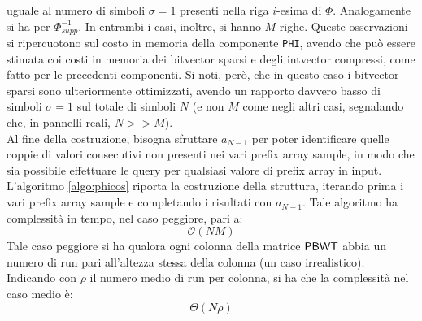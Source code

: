 uguale al numero di simboli $\sigma=1$ presenti nella riga $i$-esima di
$\varPhi$. Analogamente 
si ha per $\varPhi^{-1}_{supp}$. In entrambi i casi, inoltre, si hanno $M$
righe. Queste osservazioni si ripercuotono sul costo in memoria della componente
\texttt{PHI}, avendo che può essere stimata coi costi in memoria dei bitvector
sparsi e degli intvector compressi, come fatto per le precedenti componenti. Si
noti, però, che in questo caso i bitvector sparsi sono ulteriormente
ottimizzati,
avendo un rapporto davvero basso di simboli $\sigma=1$ sul totale di
simboli $N$ (e non $M$
come negli altri casi, segnalando che, in pannelli reali, $N>>M$).\\ 
Al fine della costruzione, bisogna sfruttare $a_{N-1}$ per poter
identificare quelle coppie di valori consecutivi non presenti nei vari
prefix array sample, in modo che sia possibile effettuare le query per
qualsiasi valore di prefix array in input.\\
L'algoritmo \ref{algo:phicos} riporta la costruzione della struttura,
iterando prima i vari prefix array sample e completando i
risultati con $a_{N-1}$. Tale algoritmo ha complessità in tempo, nel caso
peggiore, pari a:
\begin{equation}
  \label{eq:phicos}
  \mathcal{O}(NM)
\end{equation}
Tale caso peggiore si ha qualora ogni colonna della matrice $\mbox{\rm {\sf PBWT}}$ abbia un
numero di 
run pari all'altezza stessa della colonna (un caso irrealistico). Indicando con
$\rho$ il numero medio 
di run per colonna, si ha che la complessità nel caso medio è:
\begin{equation}
  \label{eq:phicos2}
  \varTheta(N\rho)
\end{equation}

